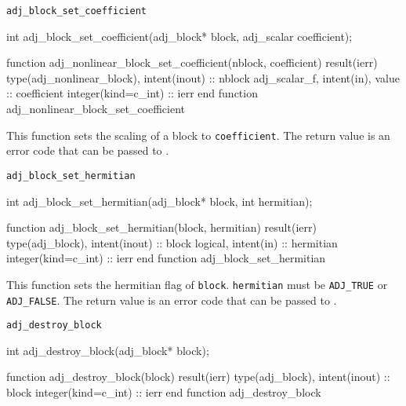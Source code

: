 \begin{boxwithtitle}{\texttt{adj_block_set_coefficient}}
\begin{minipage}{\columnwidth}
\begin{ccode}
  int adj_block_set_coefficient(adj_block* block, adj_scalar coefficient);
\end{ccode}
\begin{fortrancode}
  function adj_nonlinear_block_set_coefficient(nblock, coefficient) result(ierr)
    type(adj_nonlinear_block), intent(inout) :: nblock
    adj_scalar_f, intent(in), value :: coefficient
    integer(kind=c_int) :: ierr
  end function adj_nonlinear_block_set_coefficient
\end{fortrancode}
\end{minipage}
\end{boxwithtitle}

This function sets the scaling of a block to \texttt{coefficient}. 
The return value is an error code that can be passed to .


\begin{boxwithtitle}{\texttt{adj_block_set_hermitian}}
\begin{minipage}{\columnwidth}
\begin{ccode}
  int adj_block_set_hermitian(adj_block* block, int hermitian);
\end{ccode}
\begin{fortrancode}
  function adj_block_set_hermitian(block, hermitian) result(ierr)
    type(adj_block), intent(inout) :: block
    logical, intent(in) :: hermitian
    integer(kind=c_int) :: ierr
  end function adj_block_set_hermitian
\end{fortrancode}
\end{minipage}
\end{boxwithtitle}

This function sets the hermitian flag of \texttt{block}. \texttt{hermitian} must be \texttt{ADJ_TRUE} or \texttt{ADJ_FALSE}.
The return value is an error code that can be passed to .

\begin{boxwithtitle}{\texttt{adj_destroy_block}}
\begin{minipage}{\columnwidth}
\begin{ccode}
  int adj_destroy_block(adj_block* block);
\end{ccode}
\begin{fortrancode}
  function adj_destroy_block(block) result(ierr) 
    type(adj_block), intent(inout) :: block
    integer(kind=c_int) :: ierr
  end function adj_destroy_block
\end{fortrancode}
\end{minipage}
\end{boxwithtitle}

